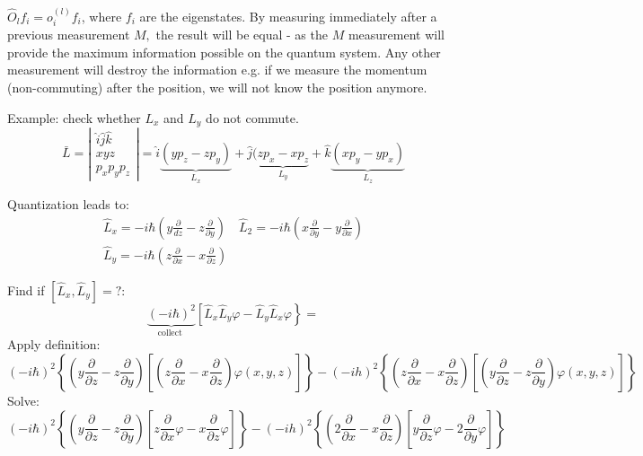 $\hat{O}_lf_i=o_i^{(l)}f_i$, where $f_i$ are the eigenstates. 
By measuring immediately after a previous measurement $M,$ the result will be equal - as the $M$ measurement will provide the maximum information possible on the quantum system. 
Any other measurement will destroy the information e.g. if we measure the momentum (non-commuting) after the position, we will not know the position anymore.

Example: check whether $L_x$ and $L_y$ do not commute.
$$\bar{L}=\left|\begin{array}{ll}\hat{i} \hat{j} \hat{k} \\ x y z \\ p_{x} p_{y} p_{z}\end{array}\right|=\hat{i} \underbrace{\left(y p_{z}-z p_{y}\right)}_{L_{x}}+\hat{j}(\underbrace{z p_{x}-x p_{z}}_{L_{y}}+\hat{k} \underbrace{\left(x p_{y}-y p_{x}\right)}_{L_{z}}$$

Quantization leads to:
$$\begin{array}{l}
\hat{L}_{x}=-i \hbar\left(y \frac{\partial}{d z}-z \frac{\partial}{\partial y}\right) \quad \hat{L}_{2}=-i \hbar\left(x \frac{\partial}{\partial y}-y \frac{\partial}{\partial x}\right) \\
\hat{L}_{y}=-i \hbar\left(z \frac{\partial}{\partial x}-x \frac{\partial}{\partial z}\right)
\end{array}$$

Find if $\left[\hat{L}_{x}, \hat{L}_{y}\right]=?$:
$$
\underbrace{(-i \hbar)^{2}}_{\text {collect }}\left[\hat{L}_{x} \hat{L}_{y} \varphi-\hat{L}_{y} \hat{L}_{x}\varphi\right\}=
$$
Apply definition:
$$
(-i \hbar)^{2}\left\{\left(y \frac{\partial}{\partial z}-z \frac{\partial}{\partial y}\right)\left[\left(z \frac{\partial}{\partial x}-x \frac{\partial}{\partial z}\right) \varphi(x, y, z)\right]\right\}-(-i h)^{2}\left\{\left(z \frac{\partial}{\partial x}-x \frac{\partial}{\partial z}\right)\left[\left(y \frac{\partial}{\partial z}-z \frac{\partial}{\partial y}\right) \varphi(x, y, z)\right]\right\}
$$
Solve:
$$(-i \hbar)^{2}\left\{\left(y \frac{\partial}{\partial z}-z \frac{\partial}{\partial y}\right)\left[z \frac{\partial}{\partial x} \varphi-x \frac{\partial}{\partial z} \varphi\right]\right\}-(-i h)^{2}\left\{\left(2 \frac{\partial}{\partial x}-x \frac{\partial}{\partial z}\right)\left[y \frac{\partial}{\partial z} \varphi-2 \frac{\partial}{\partial y} \varphi\right]\right\}$$

